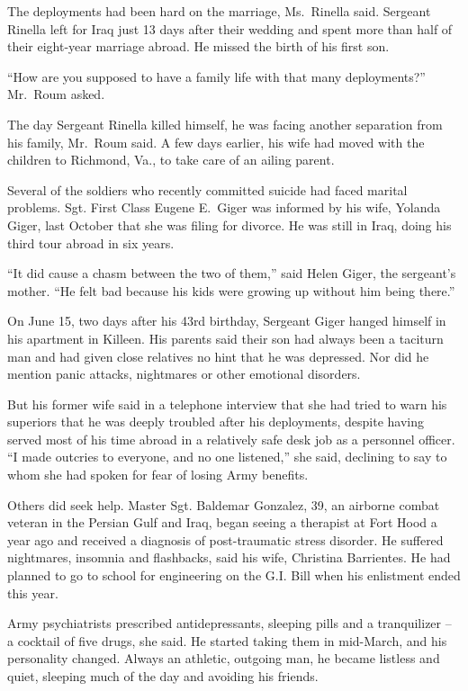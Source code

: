 ﻿\documentclass[12pt]{article}
\begin{document}
The deployments had been hard on the marriage, Ms.~Rinella said. Sergeant Rinella left for Iraq just
13 days after their wedding and spent more than half of their eight-year marriage abroad. He missed
the birth of his first son.

``How are you supposed to have a family life with that many deployments?'' Mr.~Roum asked.

The day Sergeant Rinella killed himself, he was facing another separation from his family, Mr.~Roum
said. A few days earlier, his wife had moved with the children to Richmond, Va., to take care of an
ailing parent.

Several of the soldiers who recently committed suicide had faced marital problems. Sgt. First Class
Eugene E.~Giger was informed by his wife, Yolanda Giger, last October that she was filing for
divorce. He was still in Iraq, doing his third tour abroad in six years.

``It did cause a chasm between the two of them,'' said Helen Giger, the sergeant's mother. ``He felt
bad because his kids were growing up without him being there.''

On June 15, two days after his 43rd birthday, Sergeant Giger hanged himself in his apartment in
Killeen. His parents said their son had always been a taciturn man and had given close relatives no
hint that he was depressed. Nor did he mention panic attacks, nightmares or other emotional
disorders.

But his former wife said in a telephone interview that she had tried to warn his superiors that he
was deeply troubled after his deployments, despite having served most of his time abroad in a
relatively safe desk job as a personnel officer. ``I made outcries to everyone, and no one
listened,'' she said, declining to say to whom she had spoken for fear of losing Army benefits.

Others did seek help. Master Sgt. Baldemar Gonzalez, 39, an airborne combat veteran in the Persian
Gulf and Iraq, began seeing a therapist at Fort Hood a year ago and received a diagnosis of
post-traumatic stress disorder. He suffered nightmares, insomnia and flashbacks, said his wife,
Christina Barrientes. He had planned to go to school for engineering on the G.I. Bill when his
enlistment ended this year.

Army psychiatrists prescribed antidepressants, sleeping pills and a tranquilizer -- a cocktail of
five drugs, she said. He started taking them in mid-March, and his personality changed. Always an
athletic, outgoing man, he became listless and quiet, sleeping much of the day and avoiding his
friends.
\end{document}
